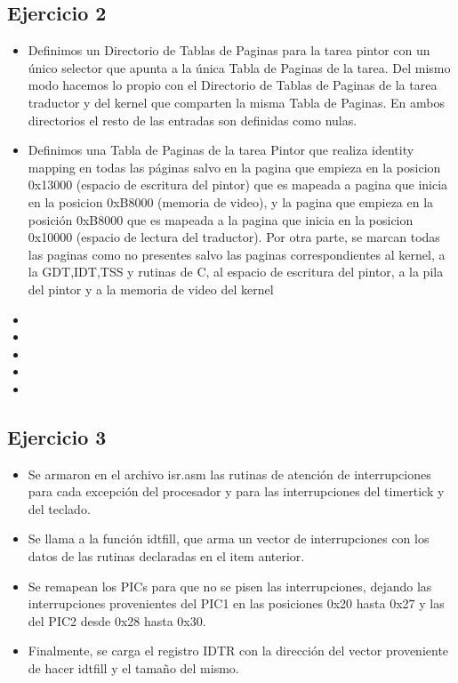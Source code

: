 \subsection{Ejercicio 2}
\begin{itemize}
 \item Definimos un Directorio de Tablas de Paginas para la tarea pintor con un \'unico selector que apunta a la \'unica Tabla de Paginas de la tarea. Del mismo modo hacemos lo propio con el Directorio de Tablas de Paginas de la tarea traductor y del kernel que comparten la misma Tabla de Paginas. En ambos directorios el resto de las entradas son definidas como nulas.
 \item Definimos una Tabla de Paginas de la tarea Pintor que realiza identity mapping en todas las p\'aginas salvo en la pagina que empieza en la posicion 0x13000 (espacio de escritura del pintor) que es mapeada a pagina que inicia en la posicion 0xB8000 (memoria de video), y la pagina que empieza en la posici\'on 0xB8000 que es mapeada a la pagina que inicia en la posicion 0x10000 (espacio de lectura del traductor). Por otra parte, se marcan todas las paginas como no presentes salvo las paginas correspondientes al kernel, a la GDT,IDT,TSS y rutinas de C, al espacio de escritura del pintor, a la pila del pintor y a la memoria de video del kernel
 \item 
 \item 
 \item 
 \item 
 \item 
\end{itemize}

\subsection{Ejercicio 3}
\begin{itemize}
 \item Se armaron en el archivo isr.asm las rutinas de atenci\'on de interrupciones para cada excepci\'on del procesador y para las interrupciones del timertick y del teclado.
 \item Se llama a la funci\'on idtfill, que arma un vector de interrupciones con los datos de las rutinas declaradas en el item anterior.
 \item Se remapean los PICs para que no se pisen las interrupciones, dejando las interrupciones provenientes del PIC1 en las posiciones 0x20 hasta 0x27 y las del PIC2 desde 0x28 hasta 0x30.
 \item Finalmente, se carga el registro IDTR con la direcci\'on del vector proveniente de hacer idtfill y el tama\~no del mismo.
\end{itemize}

